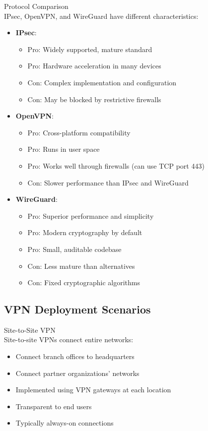 \begin{concept}{Protocol Comparison}\\
IPsec, OpenVPN, and WireGuard have different characteristics:
\begin{itemize}
    \item \textbf{IPsec}:
    \begin{itemize}
        \item Pro: Widely supported, mature standard
        \item Pro: Hardware acceleration in many devices
        \item Con: Complex implementation and configuration
        \item Con: May be blocked by restrictive firewalls
    \end{itemize}
    \item \textbf{OpenVPN}:
    \begin{itemize}
        \item Pro: Cross-platform compatibility
        \item Pro: Runs in user space
        \item Pro: Works well through firewalls (can use TCP port 443)
        \item Con: Slower performance than IPsec and WireGuard
    \end{itemize}
    \item \textbf{WireGuard}:
    \begin{itemize}
        \item Pro: Superior performance and simplicity
        \item Pro: Modern cryptography by default
        \item Pro: Small, auditable codebase
        \item Con: Less mature than alternatives
        \item Con: Fixed cryptographic algorithms
    \end{itemize}
\end{itemize}
\end{concept}

\subsection{VPN Deployment Scenarios}

\begin{concept}{Site-to-Site VPN}\\
Site-to-site VPNs connect entire networks:
\begin{itemize}
    \item Connect branch offices to headquarters
    \item Connect partner organizations' networks
    \item Implemented using VPN gateways at each location
    \item Transparent to end users
    \item Typically always-on connections
\end{itemize}
\end{concept}

